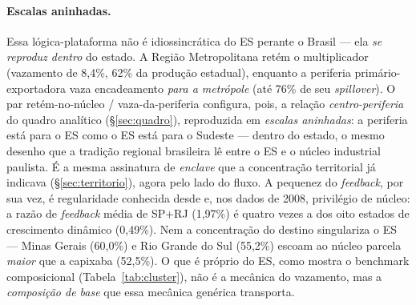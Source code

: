 \documentclass[11pt,a4paper]{article}
\begin{document}
\paragraph{Escalas aninhadas.} Essa lógica-plataforma não é idiossincrática do ES perante o
Brasil --- ela \emph{se reproduz dentro} do estado. A Região Metropolitana retém o multiplicador
(vazamento de 8,4\%, 62\% da produção estadual), enquanto a periferia primário-exportadora vaza
encadeamento \emph{para a metrópole} (até 76\% de seu \emph{spillover}). O par retém-no-núcleo /
vaza-da-periferia configura, pois, a relação \emph{centro-periferia} do quadro analítico
(\S\ref{sec:quadro}), reproduzida em \emph{escalas aninhadas}: a periferia está para o ES
como o ES está para o Sudeste --- dentro do estado, o mesmo desenho que a tradição
regional brasileira lê entre o ES e o núcleo industrial paulista. É a mesma assinatura de
\emph{enclave} que a concentração territorial já indicava (\S\ref{sec:territorio}), agora
pelo lado do fluxo. A pequenez do \emph{feedback}, por sua vez, é regularidade conhecida
desde \citet{miller1966} e, nos dados de 2008, privilégio de núcleo: a razão de
\emph{feedback} média de SP+RJ (1,97\%) é quatro vezes a dos oito estados de crescimento
dinâmico (0,49\%). Nem a concentração do destino singulariza o ES --- Minas Gerais
(60,0\%) e Rio Grande do Sul (55,2\%) escoam ao núcleo parcela \emph{maior} que a capixaba
(52,5\%). O que é próprio do ES, como mostra o benchmark composicional
(Tabela~\ref{tab:cluster}), não é a mecânica do vazamento, mas a \emph{composição de base}
que essa mecânica genérica transporta.

\end{document}
